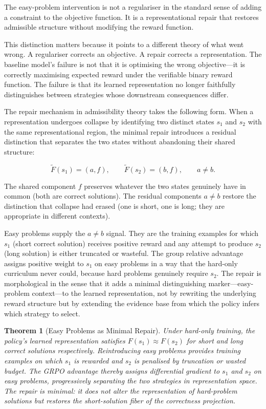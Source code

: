 \documentclass[11pt]{article}
\theoremstyle{rthm}
\newtheorem{theorem}{Theorem}[section]
\theoremstyle{rdef}
\theoremstyle{remark}
\begin{document}
The easy-problem intervention is not a regulariser in the standard
sense of adding a constraint to the objective function. It is a
representational repair that restores admissible structure without
modifying the reward function.

This distinction matters because it points to a different theory of
what went wrong. A regulariser corrects an objective. A repair
corrects a representation. The baseline model's failure is not that
it is optimising the wrong objective---it is correctly maximising
expected reward under the verifiable binary reward function. The
failure is that its learned representation no longer faithfully
distinguishes between strategies whose downstream consequences differ.

The repair mechanism in admissibility theory takes the following
form. When a representation undergoes collapse by identifying two
distinct states $s_1$ and $s_2$ with the same representational
region, the minimal repair introduces a residual distinction that
separates the two states without abandoning their shared structure:

\[
\widetilde{F}(s_1) = (a, f), \qquad \widetilde{F}(s_2) = (b, f),
\qquad a \neq b.
\]

The shared component $f$ preserves whatever the two states genuinely
have in common (both are correct solutions). The residual components
$a \neq b$ restore the distinction that collapse had erased (one is
short, one is long; they are appropriate in different contexts).

Easy problems supply the $a \neq b$ signal. They are the training
examples for which $s_1$ (short correct solution) receives positive
reward and any attempt to produce $s_2$ (long solution) is either
truncated or wasteful. The group relative advantage assigns positive
weight to $s_1$ on easy problems in a way that the hard-only curriculum
never could, because hard problems genuinely require $s_2$. The repair
is morphological in the sense that it adds a minimal distinguishing
marker---easy-problem context---to the learned representation, not by
rewriting the underlying reward structure but by extending the evidence
base from which the policy infers which strategy to select.

\begin{theorem}[Easy Problems as Minimal Repair]
\label{thm:easyrepair}
Under hard-only training, the policy's learned representation satisfies
$F(s_1) \approx F(s_2)$ for short and long correct solutions
respectively. Reintroducing easy problems provides training examples
on which $s_1$ is rewarded and $s_2$ is penalised by truncation or
wasted budget. The GRPO advantage thereby assigns differential gradient
to $s_1$ and $s_2$ on easy problems, progressively separating the
two strategies in representation space. The repair is minimal: it does
not alter the representation of hard-problem solutions but restores
the short-solution fiber of the correctness projection.
\end{theorem}
\end{document}
